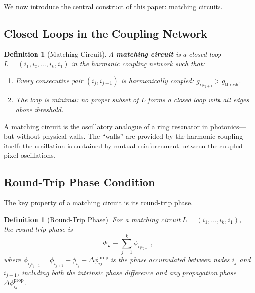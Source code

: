 \documentclass[11pt,twocolumn,a4paper]{article}
\newtheorem{definition}[theorem]{Definition}
\begin{document}

We now introduce the central construct of this paper: matching circuits.

\subsection{Closed Loops in the Coupling Network}

\begin{definition}[Matching Circuit]\label{def:matching_circuit}
A \textbf{matching circuit} is a closed loop $L = (i_1, i_2, \ldots, i_k, i_1)$ in the harmonic coupling network such that:
\begin{enumerate}[label=(\roman*)]
    \item Every consecutive pair $(i_j, i_{j+1})$ is harmonically coupled: $g_{i_j i_{j+1}} > g_{\text{thresh}}$.
    \item The loop is \emph{minimal}: no proper subset of $L$ forms a closed loop with all edges above threshold.
\end{enumerate}
\end{definition}

A matching circuit is the oscillatory analogue of a ring resonator in photonics---but without physical walls. The ``walls'' are provided by the harmonic coupling itself: the oscillation is sustained by mutual reinforcement between the coupled pixel-oscillations.

\subsection{Round-Trip Phase Condition}

The key property of a matching circuit is its round-trip phase.

\begin{definition}[Round-Trip Phase]\label{def:round_trip_phase}
For a matching circuit $L = (i_1, \ldots, i_k, i_1)$, the round-trip phase is
\begin{equation}
    \Phi_L = \sum_{j=1}^{k} \phi_{i_j i_{j+1}},
    \label{eq:round_trip_phase}
\end{equation}
where $\phi_{i_j i_{j+1}} = \phi_{i_{j+1}} - \phi_{i_j} + \Delta\phi_{ij}^{\text{prop}}$ is the phase accumulated between nodes $i_j$ and $i_{j+1}$, including both the intrinsic phase difference and any propagation phase $\Delta\phi_{ij}^{\text{prop}}$.
\end{definition}
\end{document}

